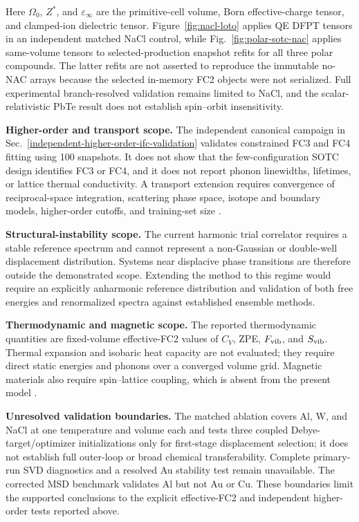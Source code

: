 \documentclass[aps,prb,reprint,amsmath,amssymb,floatfix]{revtex4-2}
\begin{document}
\color{revisionblue}
Here \(\Omega_0\), \(Z^*\), and \(\varepsilon_\infty\) are the primitive-cell
volume, Born effective-charge tensor, and clamped-ion dielectric tensor.
Figure~\ref{fig:nacl-loto} applies QE DFPT tensors in an independent matched
NaCl control, while Fig.~\ref{fig:polar-sotc-nac} applies same-volume tensors to
selected-production snapshot refits for all three polar compounds. The latter
refits are not asserted to reproduce the immutable no-NAC arrays because the
selected in-memory FC2 objects were not serialized. Full experimental
branch-resolved validation remains limited to NaCl, and the scalar-relativistic
PbTe result does not establish spin--orbit insensitivity.
\color{black}

\color{revisionblue}
\textbf{Higher-order and transport scope.} The independent canonical campaign
in Sec.~\ref{independent-higher-order-ifc-validation} validates constrained FC3
and FC4 fitting using 100 snapshots. It does not show that the
few-configuration SOTC design identifies FC3 or FC4, and it does not report
phonon linewidths, lifetimes, or lattice thermal conductivity. A transport
extension requires convergence of reciprocal-space integration, scattering
phase space, isotope and boundary models, higher-order cutoffs, and training-set
size \cite{ref40}.
\color{black}

\color{revisionblue}
\textbf{Structural-instability scope.} The current harmonic trial correlator
requires a stable reference spectrum and cannot represent a non-Gaussian or
double-well displacement distribution. Systems near displacive phase
transitions are therefore outside the demonstrated scope. Extending the method
to this regime would require an explicitly anharmonic reference distribution
and validation of both free energies and renormalized spectra against
established ensemble methods.
\color{black}

\color{revisionblue}
\textbf{Thermodynamic and magnetic scope.} The reported thermodynamic quantities
are fixed-volume effective-FC2 values of \(C_V\), ZPE, \(F_{\rm vib}\), and
\(S_{\rm vib}\). Thermal expansion and isobaric heat capacity are not evaluated;
they require direct static energies and phonons over a converged volume grid.
Magnetic materials also require spin--lattice coupling, which is absent from the
present model \cite{ref41}.
\color{black}

\color{revisionblue}
\textbf{Unresolved validation boundaries.} The matched ablation covers Al, W,
and NaCl at one temperature and volume each and tests three coupled
Debye-target/optimizer initializations only for first-stage displacement
selection; it does not establish full outer-loop or broad chemical
transferability. Complete primary-run SVD diagnostics and a resolved Au
stability test remain unavailable. The corrected MSD benchmark validates Al
but not Au or Cu. These boundaries limit the supported conclusions to the
explicit effective-FC2 and independent higher-order tests reported above.
\color{black}
\end{document}
